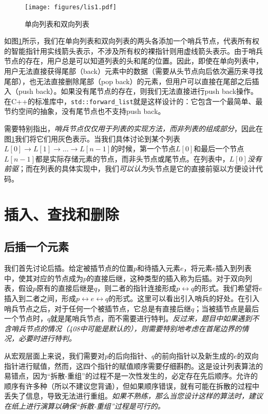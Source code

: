\begin{figure}
  \centering
  \texttt{[image: figures/lis1.pdf]}
  \caption{单向列表和双向列表}
  \label{fig:lis1}
\end{figure}

如图\ref{fig:lis1}所示，我们在单向列表和双向列表的两头各添加一个哨兵节点，代表所有权的智能指针用实线箭头表示，不涉及所有权的裸指针则用虚线箭头表示。由于哨兵节点的存在，用户总是可以知道列表的头和尾的位置。因此，即使在单向列表中，用户无法直接获得尾部（back）元素中的数据（需要从头节点向后依次遍历来寻找尾部），也无法直接删除尾部（pop back）的元素，但用户可以直接在尾部之后插入（push back）。如果没有尾节点的存在，则我们无法直接进行push back操作。在C++的标准库中，\lstinline{std::forward_list}就是这样设计的：它包含一个最简单、最节约空间的抽象，没有尾节点也不支持push back。

需要特别指出，\textit{哨兵节点仅仅用于列表的实现方法，而非列表的组成部分}，因此在图\ref{fig:lis1}我们将它们用灰色表示。当我们具体讨论到某个列表$L[0]\to L[1]\to \dots\to L[n-1]$的时候，第一个节点$L[0]$和最后一个节点$L[n-1]$都是实际存储元素的节点，而非头节点或尾节点。在列表中，$L[0]$\textit{没有前驱}；而在列表的具体实现中，我们\textit{可以认为}头节点是它的直接前驱以方便设计代码。

\section{插入、查找和删除}
\subsection{后插一个元素}
我们首先讨论后插。给定被插节点的位置$p$和待插入元素$e$，将元素$e$插入到列表中，使其对应的节点成为$p$的直接后继，这种类型的插入称为后插。对于双向列表，假设$p$原有的直接后继是$q$，则二者的指针连接形成$p\leftrightarrow q$的形式。我们希望将$e$插入到二者之间，形成$p\leftrightarrow e\leftrightarrow q$的形式。这里可以看出引入哨兵的好处。在引入哨兵节点之后，对于任何一个被插节点，它总是有直接后继$q$；当被插节点是最后一个节点时，$q$就是尾哨兵节点，而不需要进行特判。\textit{反过来，题目中如果遇到不含哨兵节点的情况（408中可能是默认的），则需要特别地考虑在首尾边界的情况，必要时进行特判。}

从宏观层面上来说，我们需要对$p$的后向指针、$q$的前向指针以及新生成的$e$的双向指针进行赋值，然而，这四个指针的赋值顺序需要仔细斟酌。这是设计列表算法的易错点，因为“拆散-重组”的过程不是一次性发生的，必定存在先后顺序。允许的顺序有许多种（所以不建议您背诵），但如果顺序错误，就有可能在拆散的过程中丢失了信息，导致无法进行重组。\textit{如果不熟练，那么当您设计这样的算法时，建议在纸上进行演算以确保“拆散-重组”过程是可行的。}

